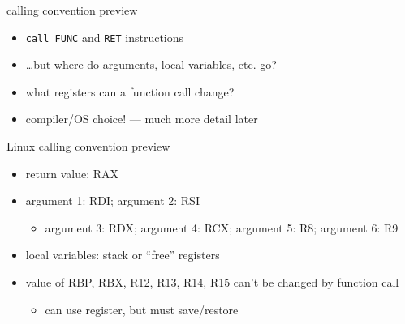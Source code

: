 \begin{frame}{calling convention preview}
    \begin{itemize}
    \item \texttt{call FUNC} and \texttt{RET} instructions
    \item \ldots but where do arguments, local variables, etc. go?
    \item what registers can a function call change?
    \item compiler/OS choice! --- much more detail later
    \end{itemize}
\end{frame}
\begin{frame}{Linux calling convention preview}
        \begin{itemize}
        \item return value: RAX
        \item argument 1: RDI; argument 2: RSI
            \begin{itemize}
            \item argument 3: RDX; argument 4: RCX; argument 5: R8; argument 6: R9
            \end{itemize}
        \item local variables: stack or ``free'' registers
        \item value of RBP, RBX, R12, R13, R14, R15 can't be changed by function call
            \begin{itemize}
            \item can use register, but must save/restore
            \end{itemize}
        \end{itemize}
\end{frame}
